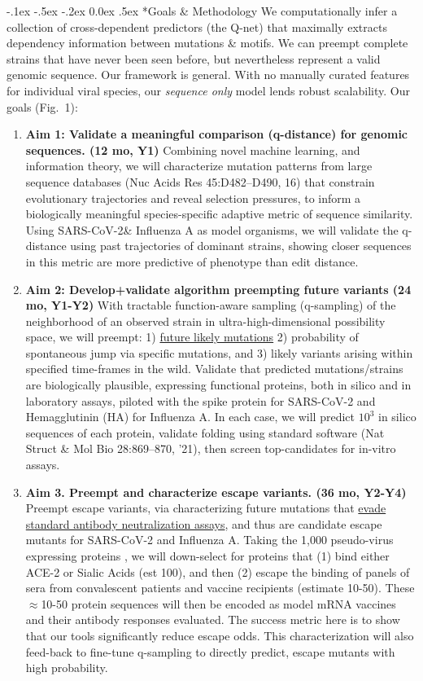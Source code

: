 \documentclass[onecolumn, compsoc,12pt]{IEEEtran}
\makeatletter
\renewcommand\paragraph{\@startsection {section}{1}{\z@}%
                                   {-.1ex \@plus -.5ex \@minus -.2ex}%
                                   {0.0ex \@plus.5ex}%
                                   {\fontsize{11}{10}\selectfont\bfseries\itshape\sffamily\color{black}}}
\def\hcov{SARS-CoV-2\xspace}
\def\infl{Influenza A\xspace}
\makeatother
\begin{document}
\paragraph*{Goals \& Methodology}
We computationally infer a collection of cross-dependent predictors (the Q-net) that maximally extracts dependency information between mutations \& motifs. We can preempt complete strains that have never been seen before, but nevertheless represent a valid genomic sequence. Our framework is general. With no manually curated features for  individual viral species, our \textit{sequence only} model lends robust scalability. 
Our goals (Fig.~1): \begin{enumerate} 
[label=$\square$, leftmargin=0pt,
labelindent=0em, topsep=0.1em, labelsep=*, itemsep=.25em,itemindent=1em]

\item \textbf{Aim 1: Validate  a meaningful comparison (q-distance) for genomic sequences. (12 mo, Y1)}  Combining novel machine learning, and  information theory, we will  characterize  mutation patterns  from large sequence databases (Nuc Acids Res 45:D482--D490, 16) that constrain evolutionary trajectories and reveal selection pressures,  to inform a biologically meaningful species-specific adaptive metric of sequence similarity. Using \hcov \& \infl as model organisms, we will validate the q-distance using past trajectories  of dominant strains, showing closer sequences in this metric are more predictive of phenotype than edit distance.
\item \textbf{Aim 2: Develop+validate  algorithm preempting future variants (24 mo, Y1-Y2) } With  tractable function-aware sampling (q-sampling) of the neighborhood of an observed strain in ultra-high-dimensional  possibility space, we will preempt: 1) \uline{future likely mutations} 2) probability of spontaneous jump  via specific mutations, and 3)  likely variants arising within specified time-frames in the wild. Validate  that predicted mutations/strains  are biologically plausible,  expressing functional proteins, both  in silico and in laboratory assays, piloted with the spike protein for \hcov and Hemagglutinin (HA) for Influenza A. In each case, we will predict $10^3$ in silico sequences of each protein, validate  folding  using standard software (Nat Struct \& Mol Bio 28:869--870, '21), then screen top-candidates for in-vitro assays.
\item \textbf{Aim 3. Preempt and characterize escape variants. (36 mo, Y2-Y4) } Preempt escape variants, via characterizing future mutations that  \uline{evade standard antibody neutralization assays}, and thus are candidate escape mutants for  \hcov and \infl. Taking the 1,000 pseudo-virus expressing proteins , we will down-select for proteins that (1) bind either ACE-2 or Sialic Acids (est 100), and then (2) escape the binding of panels of sera from convalescent patients and vaccine recipients (estimate 10-50). These $\approx$10-50 protein sequences will then be encoded as model mRNA vaccines and their antibody responses evaluated. The success metric here is to show that our tools significantly reduce escape odds. This characterization will also feed-back to fine-tune q-sampling to directly predict, escape mutants with high probability.

\end{enumerate}
\end{document}
